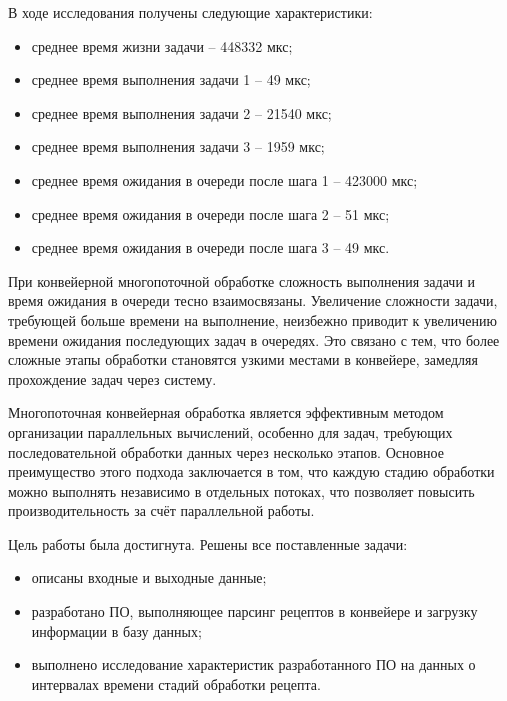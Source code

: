В ходе исследования получены следующие характеристики:
\begin{itemize}
    \item среднее время жизни задачи -- 448332 мкс;
    \item среднее время выполнения задачи 1 -- 49 мкс;
    \item среднее время выполнения задачи 2 -- 21540 мкс;
    \item среднее время выполнения задачи 3 -- 1959 мкс;
    \item среднее время ожидания в очереди после шага 1 -- 423000 мкс;
    \item среднее время ожидания в очереди после шага 2 -- 51 мкс;
    \item среднее время ожидания в очереди после шага 3 -- 49 мкс.
\end{itemize}

При конвейерной многопоточной обработке сложность выполнения задачи и время ожидания
в очереди тесно взаимосвязаны. Увеличение сложности задачи,
требующей больше времени на выполнение, неизбежно приводит к увеличению
времени ожидания последующих задач в очередях. Это связано с тем, что более
сложные этапы обработки становятся узкими местами в конвейере,
замедляя прохождение задач через систему.

\clearpage


Многопоточная конвейерная обработка является эффективным методом
организации параллельных вычислений, особенно для задач,
требующих последовательной обработки данных через несколько этапов.
Основное преимущество этого подхода заключается в том, что каждую стадию
обработки можно выполнять независимо в отдельных потоках, что позволяет
повысить производительность за счёт параллельной работы.

Цель работы была достигнута.
Решены все поставленные задачи:
\begin{itemize}
    \item описаны входные и выходные данные;
    \item разработано ПО, выполняющее парсинг рецептов в конвейере и загрузку информации в базу данных;
    \item выполнено исследование характеристик разработанного ПО на данных о интервалах времени стадий обработки рецепта.
\end{itemize}
